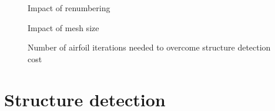\begin{figure}[h]
  \centering
  
\caption{Impact of renumbering}
\label{fig:plot-airfoil-numbering}
\end{figure}


\begin{figure}[h]
  \centering
  
\caption{Impact of mesh size}
\label{fig:plot-airfoil-size-runtime}
\end{figure}


\begin{figure}[h]
  \centering
  
\caption{Number of airfoil iterations needed to overcome structure detection cost}
\label{fig:plot-airfoil-iterations}
\end{figure}



\section{Structure detection}
